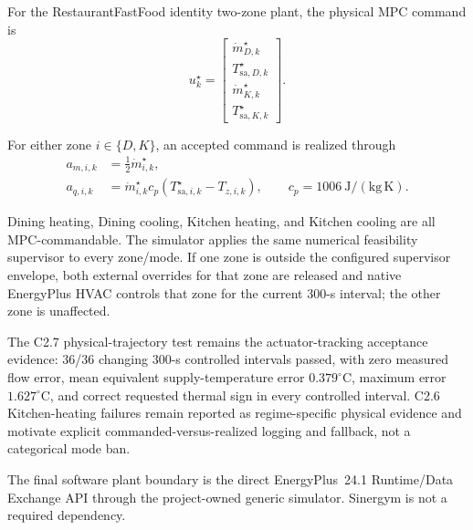 \documentclass[11pt]{article}
\newcommand{\mdot}{\dot m}
\begin{document}
For the RestaurantFastFood identity two-zone plant, the physical MPC command is
\begin{equation}
\boxed{
u_k^\star
=
\begin{bmatrix}
\mdot_{D,k}^{\star}\\
T_{\mathrm{sa},D,k}^{\star}\\
\mdot_{K,k}^{\star}\\
T_{\mathrm{sa},K,k}^{\star}
\end{bmatrix}.
}
\end{equation}

For either zone \(i\in\{D,K\}\), an accepted command is realized through
\begin{equation}
\boxed{
\begin{aligned}
a_{m,i,k}
&=
\tfrac12\mdot_{i,k}^{\star},\\
a_{q,i,k}
&=
\mdot_{i,k}^{\star}c_p
\left(
T_{\mathrm{sa},i,k}^{\star}
-
T_{z,i,k}
\right),
\qquad c_p=1006~\mathrm{J/(kg\,K)}.
\end{aligned}}
\end{equation}

Dining heating, Dining cooling, Kitchen heating, and Kitchen cooling are all
MPC-commandable.  The simulator applies the same numerical feasibility
supervisor to every zone/mode.  If one zone is outside the configured
supervisor envelope, both external overrides for that zone are released and
native EnergyPlus HVAC controls that zone for the current 300-s interval; the
other zone is unaffected.

The C2.7 physical-trajectory test remains the actuator-tracking acceptance
evidence: 36/36 changing 300-s controlled intervals passed, with zero measured
flow error, mean equivalent supply-temperature error
$0.379^\circ$C, maximum error $1.627^\circ$C, and correct requested thermal
sign in every controlled interval.  C2.6 Kitchen-heating failures remain
reported as regime-specific physical evidence and motivate explicit
commanded-versus-realized logging and fallback, not a categorical mode ban.

The final software plant boundary is the direct EnergyPlus~24.1 Runtime/Data
Exchange API through the project-owned generic simulator.  Sinergym is not a
required dependency.
\end{document}

